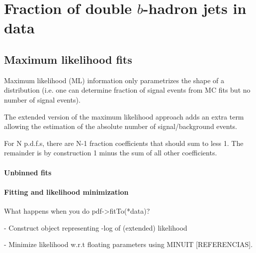 %
%
\chapter{Fraction of double $b$-hadron jets in data}\label{ch:gbbfraction}

\section{Maximum likelihood fits}\label{sec:LLFits}

Maximum likelihood (ML) information only parametrizes the shape of a 
distribution (i.e. one can determine fraction of signal events from 
MC fits but no number of signal events).

The extended version of the maximum likelihood approach adds an extra term
allowing the estimation of the absolute number of signal/background events.

For N p.d.f.s, there are N-1 fraction coefficients that should sum to less 1. The remainder is by construction 1 minus the sum of all other coefficients.



\subsubsection{Unbinned fits}


\subsubsection{Fitting and likelihood minimization}
What happens when you do pdf->fitTo(*data)?

- Construct object representing -log of (extended) likelihood

- Minimize likelihood w.r.t floating parameters using MINUIT [REFERENCIAS].




